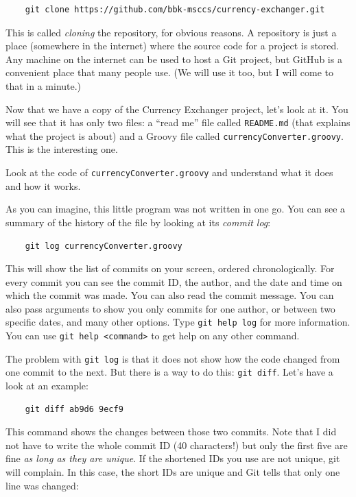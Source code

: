 \begin{verbatim}
    git clone https://github.com/bbk-msccs/currency-exchanger.git
\end{verbatim}

This is called \emph{cloning} the repository, for obvious reasons. A
repository is just a place (somewhere in the internet) where the
source code for a project is stored. Any machine on the internet can
be used to host a Git project, but GitHub is a convenient place that
many people use. (We will use it too, but I will come to that in a
minute.)

Now that we have a copy of the Currency Exchanger project, let's look
at it. You will see that it has only two files: a ``read me'' file
called \verb+README.md+ (that explains what the project is about) and
a Groovy file called \verb+currencyConverter.groovy+. This is the
interesting one. 

Look at the code of \verb+currencyConverter.groovy+ and understand
what it does and how it works. 

As you can imagine, this little program was not written in one go. You
can see a summary of the history of the file by looking at its
\emph{commit log}: 

\begin{verbatim}
    git log currencyConverter.groovy
\end{verbatim}

This will show the list of commits on your screen, ordered
chronologically. For every commit you can see the commit ID, the
author, and the date and time on which the commit was made. You can
also read the commit message. You can also pass arguments to show you
only commits for one author, or between two specific dates, and many
other options. Type \verb+git help log+ for more information. You can
use \verb+git help <command>+ to get help on any other command. 

The problem with \verb+git log+ is that it does not show how the code
changed from one commit to the next. But there is a way to do this:
\verb+git diff+. Let's have a look at an example: 

\begin{verbatim}
    git diff ab9d6 9ecf9
\end{verbatim}

This command shows the changes between those two commits. Note that I
did not have to write the whole commit ID (40 characters!) but only
the first five are fine \emph{as long as they are unique}. If the
shortened IDs you use are not unique, git will complain. In this case,
the short IDs are unique and Git tells that only one line was changed: 

